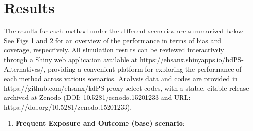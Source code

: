 \documentclass[10pt,letterpaper]{article}
\providecommand{\tightlist}{%
  \setlength{\itemsep}{0pt}\setlength{\parskip}{0pt}}
\begin{document}
\section{Results}\label{results}

The results for each method under the different scenarios are summarized
below. See Figs 1 and
2 for an overview of the performance in
terms of bias and coverage, respectively. All simulation results can be
reviewed interactively through a Shiny web application available at
https://ehsanx.shinyapps.io/hdPS-Alternatives/, providing a convenient
platform for exploring the performance of each method across various
scenarios. Analysis data and codes are provided in https://github.com/ehsanx/hdPS-proxy-select-codes, with a stable, citable release archived at Zenodo (DOI: 10.5281/zenodo.15201233 and URL: https://doi.org/10.5281/zenodo.15201233).





\begin{enumerate}
\def\labelenumi{(\roman{enumi})}
\tightlist
\item
  \textbf{Frequent Exposure and Outcome (base) scenario}:
\end{enumerate}
\end{document}
